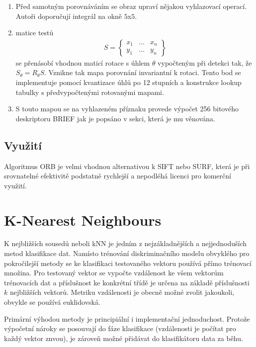 	\begin{enumerate}
		\item Před samotným porovnáváním se obraz upraví nějakou vyhlazovací operací. Autoři doporučují integrál na okně $5$x$5$. 
		\item matice testů
		\begin{align}
		S =
		\begin{Bmatrix}
		x_1 & ... & x_n \\
		y_1 & ... & y_n
		\end{Bmatrix}
		\end{align}
		se přenásobí vhodnou maticí rotace s úhlem $\theta$ vypočteným při detekci tak, že $S_{\theta} = R_{\theta}S$. Vznikne tak mapa porovnání invariantní k rotaci. Tento bod se implementuje pomocí kvantizace úhlů po 12 stupních a konstrukce lookup tabulky s předvypočtenými rotovanými mapami.
		\item S touto mapou se na vyhlazeném příznaku provede výpočet 256 bitového deskriptoru BRIEF jak je popsáno v sekci, která je mu věnována.
	\end{enumerate}

	\subsection{Využití}
	
		Algoritmus ORB je velmi vhodnou alternativou k SIFT nebo SURF, která je při srovnatelné efektivitě podstatně rychlejší a nepodléhá licenci pro komerční využití.

\section{K-Nearest Neighbours}

	K nejbližších sousedů neboli kNN je jedním z nejzákladnějších a nejjednoduších metod klasifikace dat. Namísto trénování diskriminačního modelu obvyklého pro pokročilejší metody se ke klasifikaci testovaného vektoru používá přímo trénovací množina. Pro testovaný vektor se vypočte vzdálenost ke všem vektorům trénovacích dat a příslušnost ke konkrétní třídě je určena na základě příslušnosti $k$ nejbližších vektorů. Metriku vzdálenosti je obecně možné zvolit jakoukoli, obvykle se používá euklidovská.
	
	Primární výhodou metody je principiální i implementační jednoduchost. Protože výpočetní nároky se posouvají do fáze klasifikace (vzdálenosti je počítat pro každý vektor znvou), je zároveň možné přidávat do klasifikátoru data za běhu.
	
